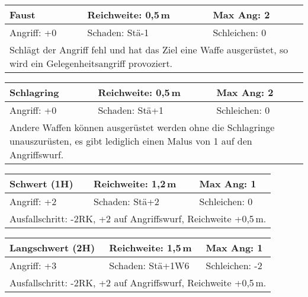 \documentclass[../../Heldenanleitung2]{subfiles}
\begin{document}
\begin{tabular}{|p{}|p{}|p{}|}
\hline
\textbf{Faust} & Reichweite: 0,5\,m & Max Ang: 2 \\
\hline
Angriff: +0 & Schaden: Stä-1 & Schleichen: 0\\
\hline
\multicolumn{3}{|p{0.99\textwidth}|}{Schlägt der Angriff fehl und hat das Ziel eine Waffe ausgerüstet, so wird ein Gelegenheitsangriff provoziert.} \\
\hline
\end{tabular}
\newline \newline\newline
\begin{tabular}{|p{}|p{}|p{}|}
\hline
\textbf{Schlagring} & Reichweite: 0,5\,m &  Max Ang: 2\\
\hline
Angriff: +0 & Schaden: Stä+1 & Schleichen: 0\\
\hline
\multicolumn{3}{|p{0.99\textwidth}|}{Andere Waffen können ausgerüstet werden ohne die Schlagringe unauszurüsten, es gibt lediglich einen Malus von 1 auf den Angriffswurf.} \\
\hline
\end{tabular}
\newline \newline\newline
\begin{tabular}{|p{}|p{}|p{}|}
\hline
\textbf{Schwert (1H)} & Reichweite: 1,2\,m & Max Ang: 1\\
\hline
Angriff: +2 & Schaden: Stä+2 & Schleichen: 0\\
\hline
\multicolumn{3}{|p{0.99\textwidth}|}{Ausfallschritt: -2RK, +2 auf Angriffswurf, Reichweite +0,5\,m.} \\
\hline
\end{tabular}
\newline \newline\newline
\begin{tabular}{|p{}|p{}|p{}|}
\hline
\textbf{Langschwert (2H)} & Reichweite: 1,5\,m & Max Ang: 1 \\
\hline
Angriff: +3 & Schaden: Stä+1W6 & Schleichen: -2\\
\hline
\multicolumn{3}{|p{0.99\textwidth}|}{Ausfallschritt: -2RK, +2 auf Angriffswurf, Reichweite +0,5\,m.} \\
\hline
\end{tabular}
\end{document}
